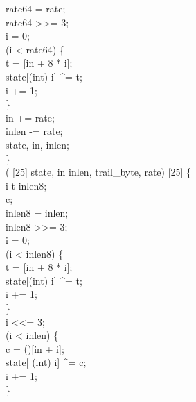rate64 = rate;\\
rate64 >{}>= 3;\\
i = 0;\\
  (i < rate64) \{\\
t = [in + 8 * i];\\
state[(int) i] \textasciicircum{}= t;\\
i += 1;\\
\}\\
in += rate;\\
inlen -= rate;\\
 state, in, inlen;\\
\}\\
  ( [25] state,   in inlen,   trail_byte,   rate) \jasminarrow{}  [25] \{\\
  i t inlen8;\\
  c;\\
inlen8 = inlen;\\
inlen8 >{}>= 3;\\
i = 0;\\
  (i < inlen8) \{\\
t = [in + 8 * i];\\
state[(int) i] \textasciicircum{}= t;\\
i += 1;\\
\}\\
i <{}<= 3;\\
  (i < inlen) \{\\
c = ()[in + i];\\
state[ (int) i] \textasciicircum{}= c;\\
i += 1;\\
\}\\
